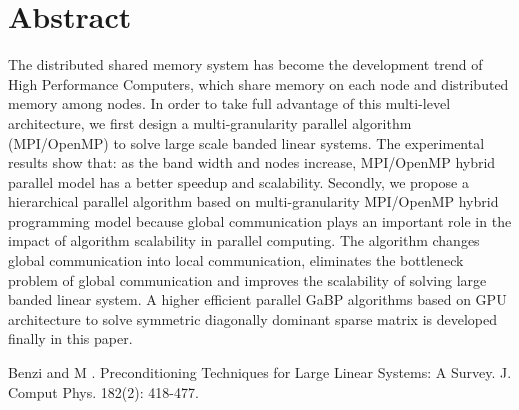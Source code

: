 \documentclass[article, A4, 11pt]{llncs}%
\begin{document}
\section*{Abstract}
The distributed shared memory system has become the development trend of High Performance Computers, which share memory on each node and distributed memory among nodes. In order to take full advantage of this multi-level architecture, we first design a multi-granularity parallel algorithm (MPI/OpenMP) to solve large scale banded linear systems. The experimental results show that: as the band width and nodes increase, MPI/OpenMP hybrid parallel model has a better speedup and scalability. Secondly, we propose a hierarchical parallel algorithm based on multi-granularity MPI/OpenMP hybrid programming model because global communication plays an important role in the impact of algorithm scalability in parallel computing. The algorithm changes global communication into local communication, eliminates the bottleneck problem of global communication and improves the scalability of solving large banded linear system. A higher efficient parallel GaBP algorithms based on GPU architecture to solve symmetric diagonally dominant sparse matrix is developed finally in this paper.


\begin{thebibliography}{10}
{\sc Benzi  and M }. {Preconditioning Techniques for Large Linear Systems: A Survey}. J. Comput Phys. 182(2): 418-477.
\end{thebibliography} %

    
\end{document}
